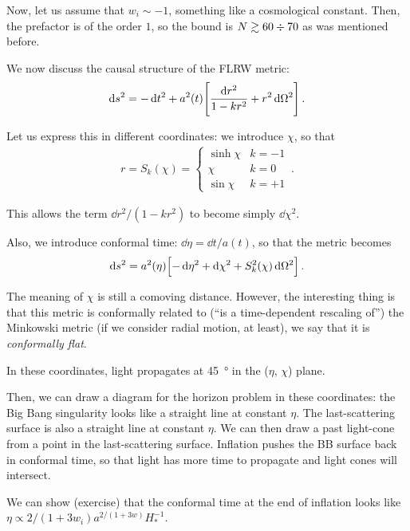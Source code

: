 \documentclass[main.tex]{subfiles}
\begin{document}
Now, let us assume that \(w_i \sim -1\), something like a cosmological constant. Then, the prefactor is of the order \(1\), so the bound is \(N \gtrsim 60 \divisionsymbol 70\) as was mentioned before. 

We now discuss the causal structure of the FLRW metric: 
%
\begin{align}
\dd{s^2} = - \dd{t^2} + a^2(t) \qty[ \frac{ \dd{r^2}}{1 - kr^2} + r^2 \dd{\Omega^2}]
\,.
\end{align}

Let us express this in different coordinates: we introduce \(\chi \), so that 
%
\begin{align}
r = S_k (\chi ) = \begin{cases}
    \sinh \chi & k = -1  \\
    \chi & k = 0 \\
    \sin \chi & k = +1
\end{cases}
\,.
\end{align}

This allows the term \(\dd{r^2} / (1 - kr^2)\) to become simply \(\dd{\chi^2}\). 

Also, we introduce conformal time: \(\dd{\eta } = \dd{t} / a(t)\), so that the metric becomes 
%
\begin{align}
\dd{s^2} = a^2(\eta ) \qty[- \dd{ \eta^2} + \dd{\chi^2} + S_k^2 (\chi ) \dd{\Omega^2}]
\,.
\end{align}

The meaning of \(\chi \) is still a comoving distance. 
However, the interesting thing is that this metric is conformally related to (``is a time-dependent rescaling of'') the Minkowski metric (if we consider radial motion, at least), we say that it is \emph{conformally flat}.

In these coordinates, light propagates at \SI{45}{\degree} in the (\(\eta \), \(\chi \)) plane. 

Then, we can draw a diagram for the horizon problem in these coordinates: the Big Bang singularity looks like a straight line at constant \(\eta \). 
The last-scattering surface is also a straight line at constant \(\eta \).
We can then draw a past light-cone from a point in the last-scattering surface. Inflation pushes the BB surface back in conformal time, so that light has more time to propagate and light cones will intersect. 

We can show (exercise) that the conformal time at the end of inflation looks like \(\eta \propto 2 / (1 + 3 w_i) a^{2 / (1 + 3w)} H_*^{-1}\). 
\end{document}

